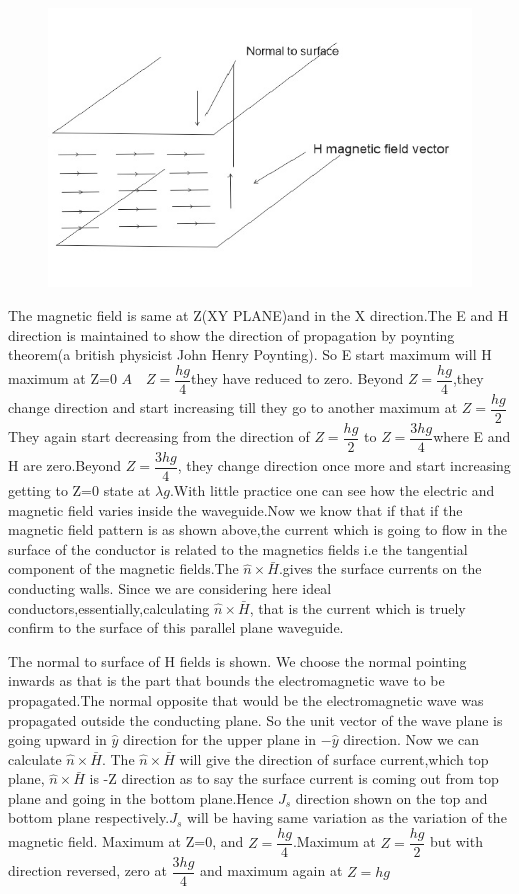 \begin{figure}[h]
\centering
\includegraphics[width=.7\linewidth]{./graphics/page703}
\caption{}
\end{figure}

The magnetic field is same at Z(XY PLANE)and in the X direction.The E and H direction is maintained to show the direction of propagation by poynting theorem(a british physicist John Henry Poynting). So E start maximum will H maximum at Z=0 \quad${A\quad Z= \dfrac{hg}{4}}$they have reduced to zero. Beyond ${Z= \dfrac{hg}{4}}$,they change direction and start increasing till they go to another maximum at ${Z=\dfrac{hg}{2}}$ They again start decreasing from the direction of ${Z=\dfrac{hg}{2}}$ to ${Z=\dfrac{3hg}{4}}$where E and H are zero.Beyond ${Z=\dfrac{3hg}{4}}$,  they change direction once more and start increasing getting to Z=0 state at ${\lambda g}$.With little practice one can see how the electric and magnetic field varies inside the waveguide.Now we know that if that if the magnetic field pattern is as shown above,the current which is going to flow in the surface of the conductor is related to the magnetics fields i.e the tangential component of the magnetic fields.The ${\hat{n}\times\bar{H}}$.gives the surface currents on the conducting walls. Since we are considering here ideal conductors,essentially,calculating ${\hat{n}\times\bar{H}}$, that is the current which is truely confirm to the surface of this parallel plane waveguide. 

The normal to surface of H fields is shown. We choose the normal pointing inwards as that is the part that bounds the electromagnetic wave to be propagated.The normal opposite that would be the electromagnetic wave was propagated outside the conducting plane. So the unit vector of the wave plane is going upward in ${\hat{y}}$ direction for the upper plane in ${-\hat{y}}$ direction. Now we can calculate ${\hat{n}\times\bar{H}}$. The ${\hat{n}\times\bar{H}}$ will give the direction of surface current,which top plane, ${\hat{n}\times\bar{H}}$ is -Z direction as to say the surface current is coming out from top plane and going in the bottom plane.Hence ${J_s}$ direction shown on the top and bottom plane respectively.${J_s}$ will be having same variation as the variation of the magnetic field. Maximum at Z=0, and ${Z= \dfrac{hg}{4}}$.Maximum at ${Z=\dfrac{hg}{2}}$ but with direction reversed, zero at ${\dfrac{3hg}{4}}$ and maximum again at ${Z=hg}$


